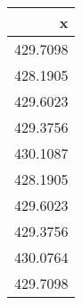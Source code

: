 \begin{knitrout}
\color{fgcolor}\begin{kframe}
\begin{alltt}
 \hlkwb{<-}   \hlstd{=}\hlstd{)}

\hlstd{(T_i[}\hlopt{:}\hlstd{])}
\end{alltt}
\end{kframe}
\begin{tabular}{r}
\hline
x\\
\hline
429.7098\\
\hline
428.1905\\
\hline
429.6023\\
\hline
429.3756\\
\hline
430.1087\\
\hline
428.1905\\
\hline
429.6023\\
\hline
429.3756\\
\hline
430.0764\\
\hline
429.7098\\
\hline
\end{tabular}


\end{knitrout}
